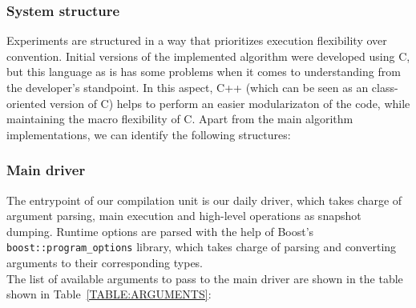 \subsubsection{System structure}
Experiments are structured in a way that prioritizes execution flexibility over convention. Initial versions of the implemented algorithm were developed using C, but this language as is has some problems when it comes to understanding from the developer's standpoint. In this aspect, C++ (which can be seen as an class-oriented version of C) helps to perform an easier modularizaton of the code, while maintaining the macro flexibility of C. Apart from the main algorithm implementations, we can identify the following structures:\\

\subsubsection{Main driver}
The entrypoint of our compilation unit is our daily driver, which takes charge of argument parsing, main execution and high-level operations as snapshot dumping.  Runtime options are parsed with the help of Boost's \texttt{boost::program\_options} library, which takes charge of parsing and converting arguments to their corresponding types. \\

The list of available arguments to pass to the main driver are shown in the table shown in Table~\ref{TABLE:ARGUMENTS}:\\


